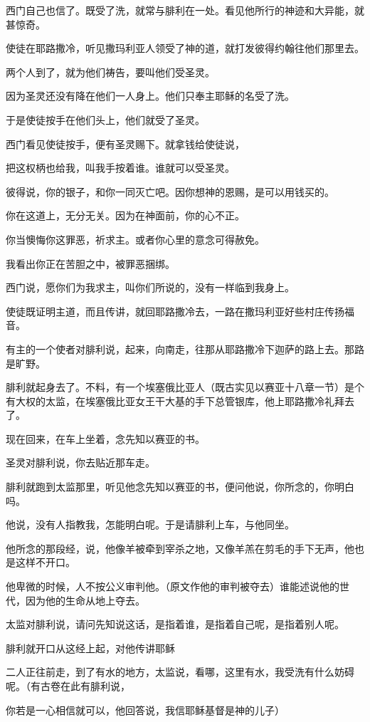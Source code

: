 \documentclass[12pt,oneside]{book}
\begin{document}
西门自己也信了。既受了洗，就常与腓利在一处。看见他所行的神迹和大异能，就甚惊奇。

使徒在耶路撒冷，听见撒玛利亚人领受了神的道，就打发彼得约翰往他们那里去。

两个人到了，就为他们祷告，要叫他们受圣灵。

因为圣灵还没有降在他们一人身上。他们只奉主耶稣的名受了洗。

于是使徒按手在他们头上，他们就受了圣灵。

西门看见使徒按手，便有圣灵赐下。就拿钱给使徒说，

把这权柄也给我，叫我手按着谁。谁就可以受圣灵。

彼得说，你的银子，和你一同灭亡吧。因你想神的恩赐，是可以用钱买的。

你在这道上，无分无关。因为在神面前，你的心不正。

你当懊悔你这罪恶，祈求主。或者你心里的意念可得赦免。

我看出你正在苦胆之中，被罪恶捆绑。

西门说，愿你们为我求主，叫你们所说的，没有一样临到我身上。

使徒既证明主道，而且传讲，就回耶路撒冷去，一路在撒玛利亚好些村庄传扬福音。

有主的一个使者对腓利说，起来，向南走，往那从耶路撒冷下迦萨的路上去。那路是旷野。

腓利就起身去了。不料，有一个埃塞俄比亚人（既古实见以赛亚十八章一节）是个有大权的太监，在埃塞俄比亚女王干大基的手下总管银库，他上耶路撒冷礼拜去了。

现在回来，在车上坐着，念先知以赛亚的书。

圣灵对腓利说，你去贴近那车走。

腓利就跑到太监那里，听见他念先知以赛亚的书，便问他说，你所念的，你明白吗。

他说，没有人指教我，怎能明白呢。于是请腓利上车，与他同坐。

他所念的那段经，说，他像羊被牵到宰杀之地，又像羊羔在剪毛的手下无声，他也是这样不开口。

他卑微的时候，人不按公义审判他。（原文作他的审判被夺去）谁能述说他的世代，因为他的生命从地上夺去。

太监对腓利说，请问先知说这话，是指着谁，是指着自己呢，是指着别人呢。

腓利就开口从这经上起，对他传讲耶稣

二人正往前走，到了有水的地方，太监说，看哪，这里有水，我受洗有什么妨碍呢。（有古卷在此有腓利说，

你若是一心相信就可以，他回答说，我信耶稣基督是神的儿子）
\end{document}
